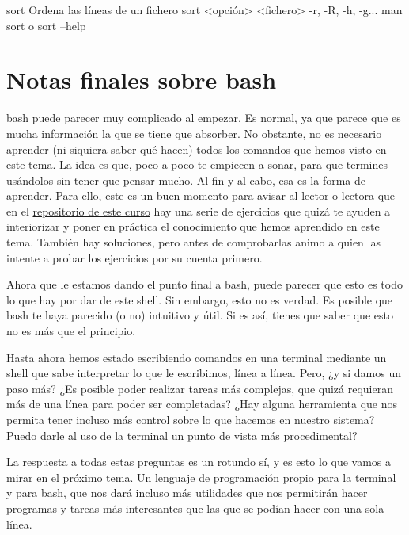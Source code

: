 \begin{command-info}
{sort}
{Ordena las líneas de un fichero}
{sort <opción> <fichero>}
{-r, -R, -h, -g...}
{man sort o sort --help}
\end{command-info}

\section{Notas finales sobre bash}
bash puede parecer muy complicado al empezar. Es normal, ya que parece que es mucha información la que se tiene que absorber. No obstante, no es necesario aprender (ni siquiera saber qué hacen) todos los comandos que hemos visto en este tema. La idea es que, poco a poco te empiecen a sonar, para que termines usándolos sin tener que pensar mucho. Al fin y al cabo, esa es la forma de aprender. Para ello, este es un buen momento para avisar al lector o lectora que en el \href{https://github.com/markelmencia/fundamentos-gnulinux}{repositorio de este curso} hay una serie de ejercicios que quizá te ayuden a interiorizar y poner en práctica el conocimiento que hemos aprendido en este tema. También hay soluciones, pero antes de comprobarlas animo a quien las intente a probar los ejercicios por su cuenta primero.

Ahora que le estamos dando el punto final a bash, puede parecer que esto es todo lo que hay por dar de este shell. Sin embargo, esto no es verdad. Es posible que bash te haya parecido (o no) intuitivo y útil. Si es así, tienes que saber que esto no es más que el principio.

Hasta ahora hemos estado escribiendo comandos en una terminal mediante un shell que sabe interpretar lo que le escribimos, línea a línea. Pero, ¿y si damos un paso más? ¿Es posible poder realizar tareas más complejas, que quizá requieran más de una línea para poder ser completadas? ¿Hay alguna herramienta que nos permita tener incluso más control sobre lo que hacemos en nuestro sistema? Puedo darle al uso de la terminal un punto de vista más procedimental?

La respuesta a todas estas preguntas es un rotundo sí, y es esto lo que vamos a mirar en el próximo tema. Un lenguaje de programación propio para la terminal y para bash, que nos dará incluso más utilidades que nos permitirán hacer programas y tareas más interesantes que las que se podían hacer con una sola línea. 
